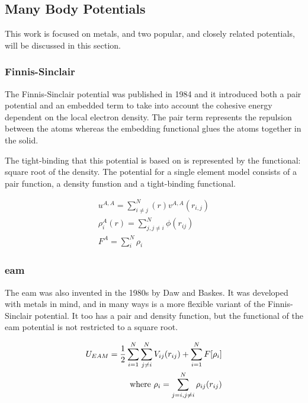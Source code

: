 \subsection{Many Body Potentials}

This work is focused on metals, and two popular, and closely related potentials, will be discussed in this section.

\subsubsection{Finnis-Sinclair}
\label{section:FinnisSinclair}

The Finnis-Sinclair potential was published in 1984\cite{finnissinclair} and it introduced both a pair potential and an embedded term to take into account the cohesive energy dependent on the local electron density.  The pair term represents the repulsion between the atoms whereas the embedding functional glues the atoms together in the solid.  

The tight-binding that this potential is based on is represented by the functional: square root of the density.  The potential for a single element model consists of a pair function, a density funstion and a tight-binding functional.

\begin{equation}
\begin{split}
u^{A,A} = \sum_{i \ne j}^{N}(r) v^{A,A}(r_{i,j}) \\
\rho^{A}_{i}(r) = \sum_{j, j \ne i}^{N} \phi(r_{ij}) \\
F^{A} = \sum_{i}^{N} \rho_i
\end{split}
\label{eq:eqFinnisSinclair}
\end{equation}


\subsubsection{\Acrlong{eam}}
\label{section:EAM}

The \acrlong{eam} was also invented in the 1980s by Daw and Baskes.  It was developed with metals in mind, and in many ways is a more flexible variant of the Finnis-Sinclair potential.  It too has a pair and density function, but the functional of the \acrshort{eam} potential is not restricted to a square root.

\begin{equation}
\begin{split}
U_{EAM} = \frac{1}{2} \sum \limits_{i=1}^{N} \sum \limits_{j\ne i}^{N} V_{ij}(r_{ij}) + \sum \limits_{i=1}^{N} F[\rho _{i}] \\
\textnormal{where   } \rho_{i} = \sum \limits_{j=i,j \ne i}^{N} \rho_{ij}(r_{ij})
\end{split}
\label{eq:eqEAM}
\end{equation}


